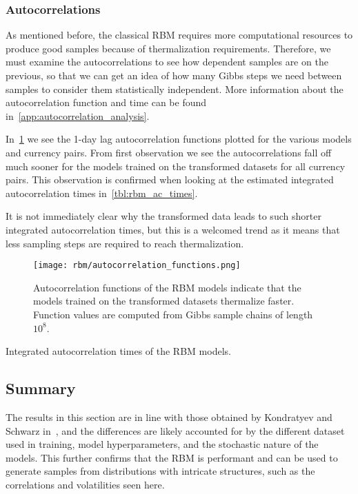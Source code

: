 \subsubsection{Autocorrelations}
As mentioned before, the classical RBM requires more computational resources to produce good samples because of thermalization requirements.
Therefore, we must examine the autocorrelations to see how dependent samples are on the previous, so that we can get an idea of how many Gibbs steps we need between samples to consider them statistically independent.
More information about the autocorrelation function and time can be found in~\cref{app:autocorrelation_analysis}.

In~\cref{fig:rbm_autocorrelation_functions} we see the 1-day lag autocorrelation functions plotted for the various models and currency pairs.
From first observation we see the autocorrelations fall off much sooner for the models trained on the transformed datasets for all currency pairs.
This observation is confirmed when looking at the estimated integrated autocorrelation times in~\cref{tbl:rbm_ac_times}.

It is not immediately clear why the transformed data leads to such shorter integrated autocorrelation times, but this is a welcomed trend as it means that less sampling steps are required to reach thermalization.
\begin{figure}[!htb]
    \begin{center}
        \texttt{[image: rbm/autocorrelation\_functions.png]}
    \end{center}
    \caption{Autocorrelation functions of the RBM models indicate that the models trained on the transformed datasets thermalize faster. Function values are computed from Gibbs sample chains of length \( 10^8 \).}
    \label{fig:rbm_autocorrelation_functions}
\end{figure}
\begin{table}[!htb]
    \centering
    \begin{adjustbox}{max width=\textwidth}
        
    \end{adjustbox}
    \caption{Integrated autocorrelation times of the RBM models.}
    \label{tbl:rbm_ac_times}
\end{table}

\subsection{Summary}
The results in this section are in line with those obtained by Kondratyev and Schwarz in~\cite{kondratyev_2019}, and the differences are likely accounted for by the different dataset used in training, model hyperparameters, and the stochastic nature of the models.
This further confirms that the RBM is performant and can be used to generate samples from distributions with intricate structures, such as the correlations and volatilities seen here.

